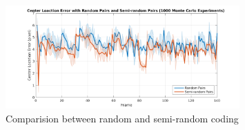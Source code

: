 \begin{figure}[!th]
	\centering
	\includegraphics[width=0.8\textwidth]{Figs/chp04_24_random_semi_random_monte_carlo.pdf}
	\caption{Comparision between random and semi-random coding}
	\label{fig:chp04_24_random_semi_random_monte_carlo}    
\end{figure}



